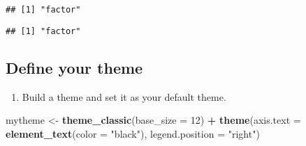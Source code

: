 \documentclass[]{article}
\newenvironment{Shaded}{\begin{snugshade}}{\end{snugshade}}
\newcommand{\CommentTok}[1]{\textcolor[rgb]{0.56,0.35,0.01}{\textit{#1}}}
\newcommand{\DataTypeTok}[1]{\textcolor[rgb]{0.13,0.29,0.53}{#1}}
\newcommand{\DecValTok}[1]{\textcolor[rgb]{0.00,0.00,0.81}{#1}}
\newcommand{\KeywordTok}[1]{\textcolor[rgb]{0.13,0.29,0.53}{\textbf{#1}}}
\newcommand{\NormalTok}[1]{#1}
\newcommand{\OperatorTok}[1]{\textcolor[rgb]{0.81,0.36,0.00}{\textbf{#1}}}
\newcommand{\StringTok}[1]{\textcolor[rgb]{0.31,0.60,0.02}{#1}}
\providecommand{\tightlist}{%
  \setlength{\itemsep}{0pt}\setlength{\parskip}{0pt}}
\begin{document}
\begin{verbatim}
## [1] "factor"
\end{verbatim}

\begin{Shaded}
\end{Shaded}

\begin{verbatim}
## [1] "factor"
\end{verbatim}

\begin{Shaded}
\end{Shaded}

\hypertarget{define-your-theme}{%
\subsection{Define your theme}\label{define-your-theme}}

\begin{enumerate}
\def\labelenumi{\arabic{enumi}.}
\setcounter{enumi}{2}
\tightlist
\item
  Build a theme and set it as your default theme.
\end{enumerate}

\begin{Shaded}
\begin{Highlighting}[]
\NormalTok{mytheme <-}\StringTok{ }\KeywordTok{theme_classic}\NormalTok{(}\DataTypeTok{base_size =} \DecValTok{12}\NormalTok{) }\OperatorTok{+}
\StringTok{  }\KeywordTok{theme}\NormalTok{(}\DataTypeTok{axis.text =} \KeywordTok{element_text}\NormalTok{(}\DataTypeTok{color =} \StringTok{"black"}\NormalTok{), }
        \DataTypeTok{legend.position =} \StringTok{"right"}\NormalTok{)}
\end{Highlighting}
\end{Shaded}
\end{document}
